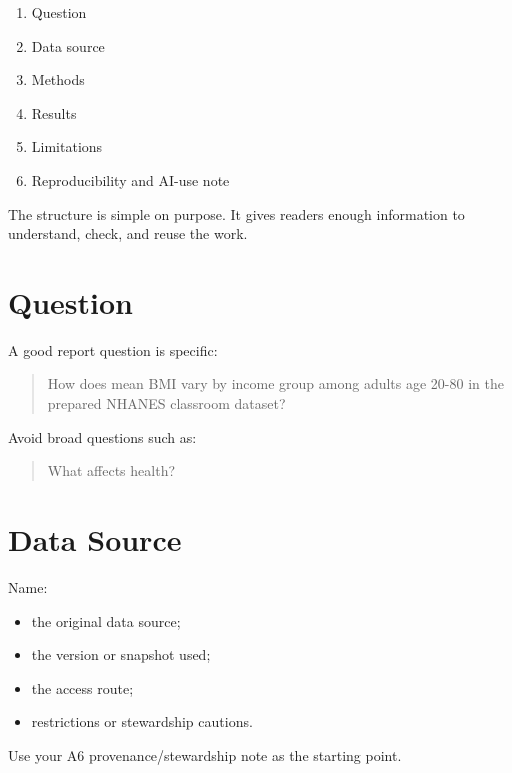 \documentclass[
  letterpaper,
  DIV=11,
  numbers=noendperiod,
  oneside]{scrreprt}
\providecommand{\tightlist}{%
  \setlength{\itemsep}{0pt}\setlength{\parskip}{0pt}}
\begin{document}
\begin{enumerate}
\def\labelenumi{\arabic{enumi}.}
\tightlist
\item
  Question
\item
  Data source
\item
  Methods
\item
  Results
\item
  Limitations
\item
  Reproducibility and AI-use note
\end{enumerate}

The structure is simple on purpose. It gives readers enough information
to understand, check, and reuse the work.

\section*{Question}\label{question-1}


A good report question is specific:

\begin{quote}
How does mean BMI vary by income group among adults age 20-80 in the
prepared NHANES classroom dataset?
\end{quote}

Avoid broad questions such as:

\begin{quote}
What affects health?
\end{quote}

\section*{Data Source}\label{data-source}


Name:

\begin{itemize}
\tightlist
\item
  the original data source;
\item
  the version or snapshot used;
\item
  the access route;
\item
  restrictions or stewardship cautions.
\end{itemize}

Use your A6 provenance/stewardship note as the starting point.
\end{document}
